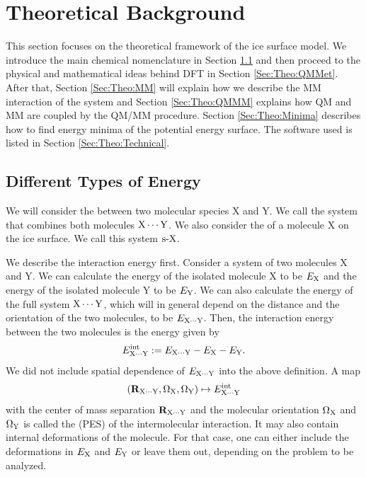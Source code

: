 \section{Theoretical Background}
\label{Sec:Theo}
This section focuses on the theoretical framework of the ice surface model. We introduce the main chemical
nomenclature in Section \ref{Sec:Theo:Interaction} and then proceed to the
physical and mathematical ideas behind DFT in Section \ref{Sec:Theo:QMMet}.
After that, Section \ref{Sec:Theo:MM} will explain how we describe the MM
interaction of the system and Section \ref{Sec:Theo:QMMM} explains how QM and
MM are coupled by the QM/MM procedure. Section \ref{Sec:Theo:Minima}
describes how to find energy minima of the potential energy surface. The
software used is listed in Section \ref{Sec:Theo:Technical}.

\newcommand\X{\enmat{\te X}}
\newcommand\Y{\enmat{\te Y}}
\newcommand\Z{\enmat{\te Z}}
\newcommand\XY{{\enmat{{\X \cdots \Y}}}}
\renewcommand\S{\enmat{\te S}}
\newcommand\sX{\enmat{{\sur\te{X}}}}
\newcommand\A{\enmat{\te A}}
\subsection{Different Types of Energy}
\label{Sec:Theo:Interaction}
We will consider the  between two molecular species X and Y. We call
the system that combines both molecules $\XY$. We also consider the
 of a molecule X on the ice surface. We call this system $\sX$.

We describe the interaction energy first.
Consider a system of two molecules X and Y. We can calculate the energy of the isolated molecule X to
be $E_{\text X}$ and the energy of the isolated molecule Y to be $E_{\text Y}$. We can also calculate the 
energy of the full system $\XY$, which will in general depend on the distance and the orientation
of the two molecules, to be $E_{\XY}$. Then, the interaction energy between the two molecules
is the energy given by
\begin{equation}
 \eint_{\XY} := E_{\XY} - E_\X - E_\Y.
 \label{Theo:InteractionEnergy}
\end{equation}
We did not include spatial dependence of $E_{\XY}$ into the above definition. A
map 
\begin{equation}
(\bo R_\XY, \Om_\X, \Om_\Y) \mapsto \eint_\XY
\label{Theo:PES}
\end{equation}
with the center 
of mass separation $\bo R_\XY$ and the molecular orientation $\Om_\X$ and $\Om_\Y$
is called the  (PES) of the intermolecular interaction. It may also contain internal deformations of
the molecule. For that case, one can either include the deformations in $E_\X$
and $E_\Y$ or leave them out, depending on the problem to be analyzed.

